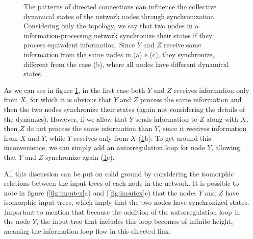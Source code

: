 \documentclass[12pt]{diazessay} %
\begin{document}
\begin{figure}[h]
	\caption{The patterns of directed connections can influence the collective dynamical states of the network nodes through synchronization. Considering only the topology, we say that two nodes in a information-processing network synchronize their states if they process equivalent information. Since $Y$ and $Z$ receive same information from the same nodes in (a) e (c), they synchronize, different from the case (b), where all nodes have different dynamical states.}
	\label{fig:ex}
\end{figure}

As we can see in figure \ref{fig:ex}, in the first case both $Y$ and $Z$ receives information only from $X$, for which it is obvious that $Y$ and $Z$ process the same information and then the two nodes synchronize their states (again not considering the details of the dynamics). However, if we allow that $Y$ sends information to $Z$ along with $X$, then $Z$ do not process the same information than $Y$, since it receives information from $X$ and $Y$, while $Y$ receives only from $X$ (\ref{fig:ex}b). To get around this inconvenience, we can simply add an autorregulation loop for node $Y$, allowing that $Y$ and $Z$ synchronize again (\ref{fig:ex}c).

All this discussion can be put on solid ground by considering the isomorphic relations between the input-trees of each node in the network. It is possible to note in figure (\ref{fig:inputex}a) and (\ref{fig:inputex}c) that the nodes $Y$ and $Z$ have isomorphic input-trees, which imply that the two nodes have synchronized states. Important to mention that because the addition of the autorregulation loop in the node $Y$, the input-tree that includes this loop becomes of infinite height, meaning the information loop flow in this directed link.
\end{document}
